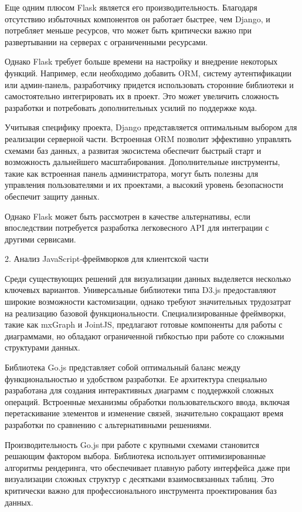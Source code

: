 Еще одним плюсом Flask является его производительность. Благодаря отсутствию избыточных компонентов он работает быстрее, чем Django, и потребляет меньше ресурсов, что может быть критически важно при развертывании на серверах с ограниченными ресурсами.

Однако Flask требует больше времени на настройку и внедрение некоторых функций. Например, если необходимо добавить ORM, систему аутентификации или админ-панель, разработчику придется использовать сторонние библиотеки и самостоятельно интегрировать их в проект. Это может увеличить сложность разработки и потребовать дополнительных усилий по поддержке кода.

Учитывая специфику проекта, Django представляется оптимальным выбором для реализации серверной части. Встроенная ORM позволит эффективно управлять схемами баз данных, а развитая экосистема обеспечит быстрый старт и возможность дальнейшего масштабирования. Дополнительные инструменты, такие как встроенная панель администратора, могут быть полезны для управления пользователями и их проектами, а высокий уровень безопасности обеспечит защиту данных.

Однако Flask может быть рассмотрен в качестве альтернативы, если впоследствии потребуется разработка легковесного API для интеграции с другими сервисами.

2. Анализ JavaScript-фреймворков для клиентской части

Среди существующих решений для визуализации данных выделяется несколько ключевых вариантов. Универсальные библиотеки типа D3.js предоставляют широкие возможности кастомизации, однако требуют значительных трудозатрат на реализацию базовой функциональности. Специализированные фреймворки, такие как mxGraph и JointJS, предлагают готовые компоненты для работы с диаграммами, но обладают ограниченной гибкостью при работе со сложными структурами данных.

Библиотека Go.js представляет собой оптимальный баланс между функциональностью и удобством разработки. Ее архитектура специально разработана для создания интерактивных диаграмм с поддержкой сложных операций. Встроенные механизмы обработки пользовательского ввода, включая перетаскивание элементов и изменение связей, значительно сокращают время разработки по сравнению с альтернативными решениями.

Производительность Go.js при работе с крупными схемами становится решающим фактором выбора. Библиотека использует оптимизированные алгоритмы рендеринга, что обеспечивает плавную работу интерфейса даже при визуализации сложных структур с десятками взаимосвязанных таблиц. Это критически важно для профессионального инструмента проектирования баз данных.

